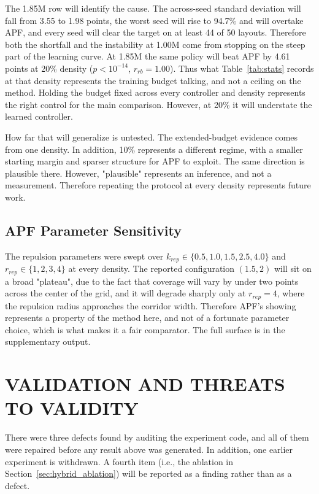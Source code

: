 \documentclass[a4paper, 10pt, conference]{ieeeconf}
\begin{document}
The 1.85M row will identify the cause. The across-seed standard
deviation will fall from 3.55 to 1.98 points, the worst seed will rise
to 94.7\% and will overtake APF, and every seed will clear the target
on at least 44 of 50 layouts. Therefore both the shortfall and the
instability at 1.00M come from stopping on the steep part of the
learning curve. At 1.85M the same policy will beat APF by 4.61 points
at 20\% density ($p<10^{-14}$, $r_{rb}=1.00$). Thus what
Table~\ref{tab:stats} records at that density represents the training
budget talking, and not a ceiling on the method. Holding the budget
fixed across every controller and density represents the right control
for the main comparison. However, at 20\% it will understate the
learned controller.

How far that will generalize is untested. The extended-budget evidence
comes from one density. In addition, 10\% represents a different
regime, with a smaller starting margin and sparser structure for APF
to exploit. The same direction is plausible there. However,
"plausible" represents an inference, and not a measurement. Therefore
repeating the protocol at every density represents future work.

\subsection{APF Parameter Sensitivity}\label{sec:sweep}

The repulsion parameters were swept over $k_{rep} \in \{0.5, 1.0, 1.5,
2.5, 4.0\}$ and $r_{rep} \in \{1,2,3,4\}$ at every density. The
reported configuration $(1.5, 2)$ will sit on a broad "plateau", due
to the fact that coverage will vary by under two points across the
center of the grid, and it will degrade sharply only at $r_{rep}=4$,
where the repulsion radius approaches the corridor width. Therefore
APF's showing represents a property of the method here, and not of a
fortunate parameter choice, which is what makes it a fair comparator.
The full surface is in the supplementary output.

\section{VALIDATION AND THREATS TO VALIDITY}\label{sec:validity}

There were three defects found by auditing the experiment code, and
all of them were repaired before any result above was generated. In
addition, one earlier experiment is withdrawn. A fourth item (i.e.,
the ablation in Section~\ref{sec:hybrid_ablation}) will be reported as
a finding rather than as a defect.
\end{document}
